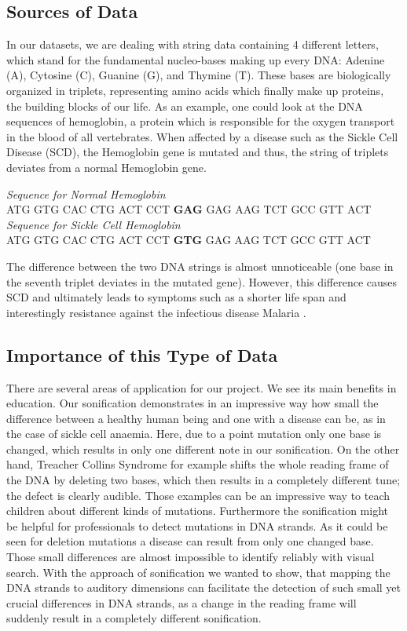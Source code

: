 \documentclass[10pt]{article}
\begin{document}
\subsection{Sources of Data}
In our datasets, we are dealing with string data containing 4 different letters, which 
stand for the fundamental nucleo-bases making up every DNA: Adenine (A), Cytosine (C), 
Guanine (G), and Thymine (T). These bases are biologically organized in triplets, 
representing amino acids which finally make up proteins, the building blocks of our life. As 
an example, one could look at the DNA sequences of hemoglobin, a protein which is 
responsible for the oxygen transport in the blood of all vertebrates. When affected by a 
disease such as the Sickle Cell Disease (SCD), the Hemoglobin gene is mutated and thus, the 
string of triplets deviates from a normal Hemoglobin gene.


\begin{center}
  \emph{Sequence for Normal Hemoglobin}\\
  ATG GTG CAC CTG ACT CCT \textbf{GAG} GAG AAG TCT GCC GTT ACT\\
  \medskip
  \emph{Sequence for Sickle Cell Hemoglobin}\\
  ATG GTG CAC CTG ACT CCT \textbf{GTG} GAG AAG TCT GCC GTT ACT\\
\end{center}

The difference between the two DNA strings is almost unnoticeable (one base in the 
seventh triplet deviates in the mutated gene). However, this difference causes SCD and 
ultimately leads to symptoms such as a shorter life span \cite{more_sickles} and interestingly 
resistance against the infectious disease Malaria \cite{sickle_cells}.
\subsection{Importance of this Type of Data}
There are several areas of application for our project. We see its main benefits in education. 
Our sonification demonstrates in an impressive way how small the difference between a 
healthy human being and one with a disease can be, as in the case of sickle cell anaemia. 
Here, due to a point mutation only one base is changed, which results in only one different 
note in our sonification. On the other hand, Treacher Collins Syndrome for example shifts the 
whole reading frame of the DNA by deleting two bases, which then results in a completely 
different tune; the defect is clearly audible. Those examples can be an impressive way to 
teach children about different kinds of mutations. Furthermore the sonification might be 
helpful for professionals to detect mutations in DNA strands. As it could be seen for deletion 
mutations a disease can result from only one changed base. Those small differences are 
almost impossible to identify reliably with visual search. With the approach of sonification 
we wanted to show, that mapping the DNA strands to auditory dimensions can facilitate the 
detection of such small yet crucial differences in DNA strands, as a change in the reading 
frame will suddenly result in a completely different sonification. 
\end{document}
